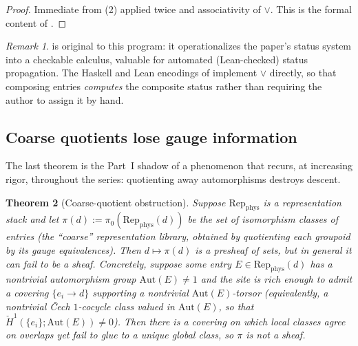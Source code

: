 \documentclass[12pt]{article}
\newtheorem{theorem}{Theorem}[section]
\theoremstyle{definition}
\theoremstyle{remark}
\newtheorem{remark}[theorem]{Remark}
\newcommand{\Repphys}{\mathrm{Rep}_{\mathrm{phys}}}
\newcommand{\Aut}{\mathrm{Aut}}
\begin{document}
\begin{proof}
Immediate from (2) applied twice and associativity of $\vee$.
This is the formal content of .
\end{proof}

\begin{remark}
 is original to this program: it operationalizes the paper's
status system into a checkable calculus, valuable for automated (Lean-checked)
status propagation. The Haskell and Lean encodings of  implement
$\vee$ directly, so that composing entries \emph{computes} the composite status
rather than requiring the author to assign it by hand.
\end{remark}

\subsection{Coarse quotients lose gauge information}

The last theorem is the Part~I shadow of a phenomenon that recurs, at increasing
rigor, throughout the series: quotienting away automorphisms destroys descent.

\begin{theorem}[Coarse-quotient obstruction]
\label{thm:coarse}
Suppose $\Repphys$ is a representation stack and let $\pi(d) :=
\pi_0(\Repphys(d))$ be the set of isomorphism classes of entries (the ``coarse''
representation library, obtained by quotienting each groupoid by its gauge
equivalences). Then $d \mapsto \pi(d)$ is a presheaf of sets, but in general it
\emph{can fail} to be a sheaf. Concretely, suppose some entry
$E \in \Repphys(d)$ has a nontrivial automorphism group $\Aut(E) \neq 1$ and the
site is rich enough to admit a covering $\{e_i \to d\}$ supporting a nontrivial
$\Aut(E)$-torsor (equivalently, a nontrivial \v{C}ech $1$-cocycle class valued in
$\Aut(E)$, so that $\check{H}^1(\{e_i\}; \Aut(E)) \neq 0$). Then there is a
covering on which local classes agree on overlaps yet fail to glue to a unique
global class, so $\pi$ is not a sheaf.
\end{theorem}
\end{document}
